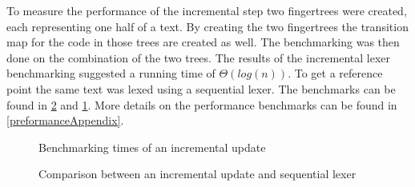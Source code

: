 To measure the performance of the incremental step two fingertrees were created,
each representing one half of a text. By creating the two fingertrees the
transition map for the code in those trees are created as well. The benchmarking
was then done on the combination of the two trees. The results of the incremental
lexer benchmarking suggested a running time of $\Theta(log(n))$. To get a reference
point the same text was lexed using a sequential lexer. The benchmarks can be
found in \cref{fig:IncSeqTime} and \cref{fig:IncTime}. More details on the
performance benchmarks can be found in \cref{preformanceAppendix}.

\begin{figure}[!h]
\caption{Benchmarking times of an incremental update\label{fig:IncTime}}
\end{figure}

\begin{figure}[!h]
\caption{Comparison between an incremental update and sequential lexer\label{fig:IncSeqTime}}
\end{figure}

